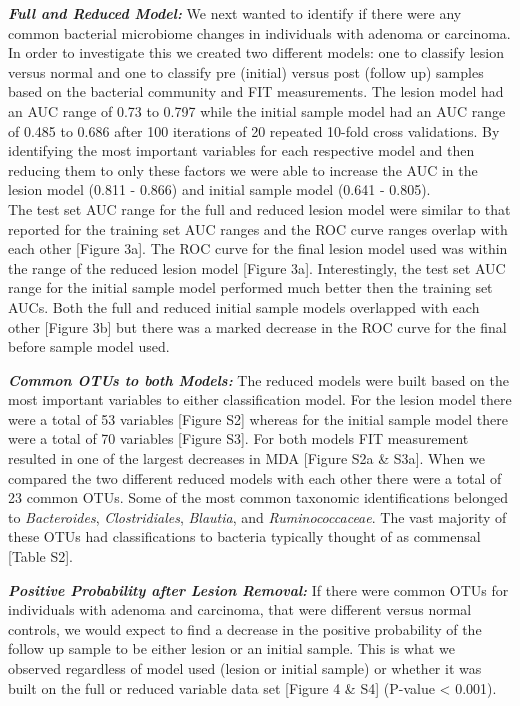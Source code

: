 \documentclass[12pt,]{article}
\begin{document}
\textbf{\emph{Full and Reduced Model:}} We next wanted to identify if
there were any common bacterial microbiome changes in individuals with
adenoma or carcinoma. In order to investigate this we created two
different models: one to classify lesion versus normal and one to
classify pre (initial) versus post (follow up) samples based on the
bacterial community and FIT measurements. The lesion model had an AUC
range of 0.73 to 0.797 while the initial sample model had an AUC range
of 0.485 to 0.686 after 100 iterations of 20 repeated 10-fold cross
validations. By identifying the most important variables for each
respective model and then reducing them to only these factors we were
able to increase the AUC in the lesion model (0.811 - 0.866) and initial
sample model (0.641 - 0.805).\\
The test set AUC range for the full and reduced lesion model were
similar to that reported for the training set AUC ranges and the ROC
curve ranges overlap with each other {[}Figure 3a{]}. The ROC curve for
the final lesion model used was within the range of the reduced lesion
model {[}Figure 3a{]}. Interestingly, the test set AUC range for the
initial sample model performed much better then the training set AUCs.
Both the full and reduced initial sample models overlapped with each
other {[}Figure 3b{]} but there was a marked decrease in the ROC curve
for the final before sample model used.

\textbf{\emph{Common OTUs to both Models:}} The reduced models were
built based on the most important variables to either classification
model. For the lesion model there were a total of 53 variables {[}Figure
S2{]} whereas for the initial sample model there were a total of 70
variables {[}Figure S3{]}. For both models FIT measurement resulted in
one of the largest decreases in MDA {[}Figure S2a \& S3a{]}. When we
compared the two different reduced models with each other there were a
total of 23 common OTUs. Some of the most common taxonomic
identifications belonged to \emph{Bacteroides}, \emph{Clostridiales},
\emph{Blautia}, and \emph{Ruminococcaceae}. The vast majority of these
OTUs had classifications to bacteria typically thought of as commensal
{[}Table S2{]}.

\textbf{\emph{Positive Probability after Lesion Removal:}} If there were
common OTUs for individuals with adenoma and carcinoma, that were
different versus normal controls, we would expect to find a decrease in
the positive probability of the follow up sample to be either lesion or
an initial sample. This is what we observed regardless of model used
(lesion or initial sample) or whether it was built on the full or
reduced variable data set {[}Figure 4 \& S4{]} (P-value \textless{}
0.001).
\end{document}
